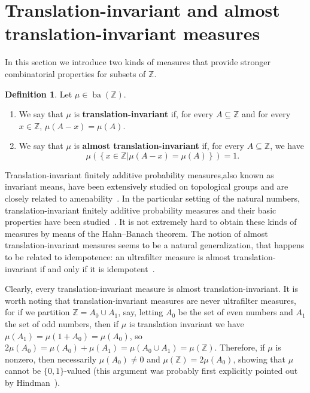 \documentclass{jloganal}
\theoremstyle{definition}
\newtheorem{defn}[thm]{Definition}    %
\newcommand{\ba}{\mathop{\mathrm{ba}}}
\begin{document}
\section{Translation-invariant and almost translation-invariant measures}
\label{Translationinvariantmeasures}

In this section we introduce two kinds of measures that provide stronger combinatorial properties for subsets of $\mathbb Z$.

\begin{defn}
    Let $\mu\in\ba(\mathbb Z)$.
    \begin{enumerate}
        \item We say that $\mu$ is {\bf translation-invariant} if, for every $A\subseteq\mathbb Z$ and for every $x\in\mathbb Z$, $\mu(A-x)=\mu(A)$.
        \item We say that $\mu$ is {\bf almost translation-invariant} if, for every $A\subseteq\mathbb Z$, we have
    \begin{equation*}
        \mu\left(\left\{x\in\mathbb Z\big|\mu(A-x)=\mu(A)\right\}\right)=1.
    \end{equation*}
    \end{enumerate}
\end{defn}

Translation-invariant finitely additive probability measures,also known as invariant means, have been extensively studied on topological groups and are closely related to amenability~\cite{F.Greenleaf}. In the particular setting of the natural numbers, translation-invariant finitely additive probability measures and their basic properties have been studied~\cite{Gardner}. It is not extremely hard to obtain these kinds of measures by means of the Hahn--Banach theorem. The notion of almost translation-invariant measures seems to be a natural generalization, that happens to be related to idempotence: an ultrafilter measure is almost translation-invariant if and only if it is idempotent~\cite{hindman-ultrafiltersch}.

Clearly, every translation-invariant measure is almost translation-invariant. It is worth noting that translation-invariant measures are never ultrafilter measures, for if we partition $\mathbb Z=A_0\cup A_1$, say, letting $A_0$ be the set of even numbers and $A_1$ the set of odd numbers, then if $\mu$ is translation invariant we have $\mu(A_1)=\mu(1+A_0)=\mu(A_0)$, so $2\mu(A_0)=\mu(A_0)+\mu(A_1)=\mu(A_0\cup A_1)=\mu(\mathbb Z)$. Therefore, if $\mu$ is nonzero, then necessarily $\mu(A_0)\neq 0$ and $\mu(\mathbb Z)=2\mu(A_0)$, showing that $\mu$ cannot be $\{0,1\}$-valued (this argument was probably first explicitly pointed out by Hindman~\cite{hindman-ultrafiltersch}).
\end{document}

